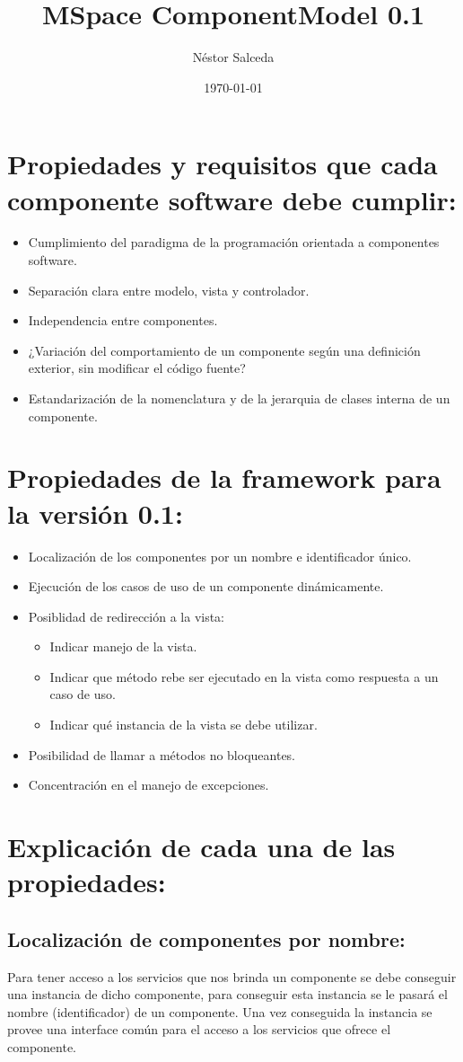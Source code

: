 \documentclass{article}
\author{Néstor Salceda}
\title{MSpace ComponentModel 0.1}
\date{\today}
\begin{document}
\maketitle
\section{Propiedades y requisitos que cada componente software debe cumplir:}
\begin{itemize}
\item Cumplimiento del paradigma de la programación orientada a componentes
software.
\item Separación clara entre modelo, vista y controlador.
\item Independencia entre componentes.
\item ¿Variación del comportamiento de un componente según una definición
exterior, sin modificar el código fuente?
\item Estandarización de la nomenclatura y de la jerarquia de clases interna de
un componente.
\end{itemize}
\section{Propiedades de la framework para la versión 0.1:}
\begin{itemize}
\item Localización de los componentes por un nombre e identificador único.
\item Ejecución de los casos de uso de un componente dinámicamente.
\item Posiblidad de redirección a la vista:
\begin{itemize}
\item Indicar manejo de la vista.
\item Indicar que método rebe ser ejecutado en la vista como respuesta a un caso
de uso.
\item Indicar qué instancia de la vista se debe utilizar.
\end{itemize}
\item Posibilidad de llamar a métodos no bloqueantes.
\item Concentración en el manejo de excepciones.
\end{itemize}
\section{Explicación de cada una de las propiedades:}
\subsection{Localización de componentes por nombre:}
Para tener acceso a los servicios que nos brinda un componente se debe conseguir
una instancia de dicho componente, para conseguir esta instancia se le pasará el
nombre (identificador) de un componente.
Una vez conseguida la instancia se provee una interface común para el acceso a
los servicios que ofrece el componente.
\end{document}
